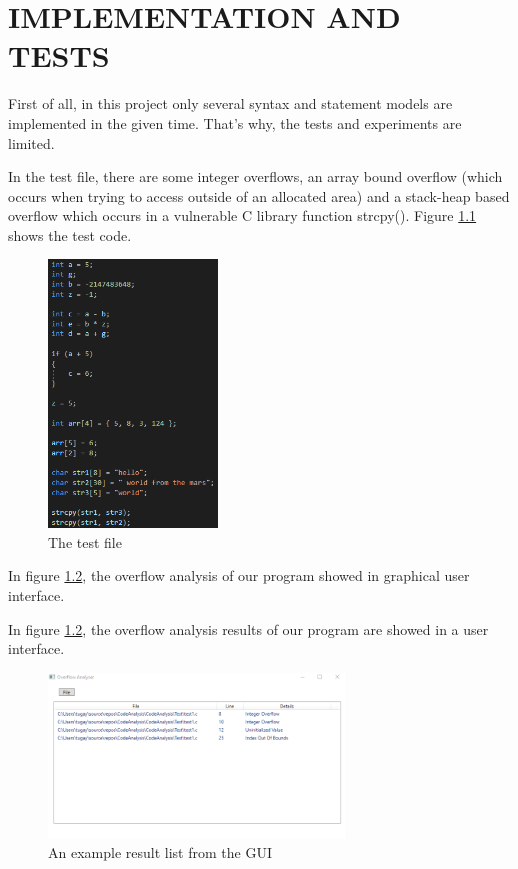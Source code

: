\chapter{IMPLEMENTATION AND TESTS}
First of all, in this project only several syntax and statement models are implemented in the given time. That's why, the tests and experiments are limited.

In the test file, there are some integer overflows, an array bound overflow (which occurs when trying to access outside of an allocated area) and a stack-heap based overflow which occurs in a vulnerable C library function strcpy(). Figure \ref{fig:TestCode} shows the test code.

\begin{figure}[!htbp]
    \centering
    \includegraphics[width=0.4\textwidth]{Imgs/test_code2.png}
    \caption{\label{fig:TestCode} The test file}
\end{figure}

In figure \ref{fig:TestResult}, the overflow analysis of our program showed in graphical user interface.

In figure \ref{fig:TestResult}, the overflow analysis results of our program are showed in a user interface.

\clearpage

\begin{figure}[!htbp]
    \centering
    \includegraphics[width=0.7\textwidth]{Imgs/test_result.png}
    \caption{\label{fig:TestResult} An example result list from the GUI}
\end{figure}

